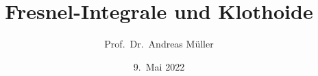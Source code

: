 %
%
%


\beamertemplatenavigationsymbolsempty
\title[Klothoide]{Fresnel-Integrale und Klothoide}
\author[A.~Müller]{Prof.~Dr.~Andreas Müller}
\date[]{9.~Mai 2022}

